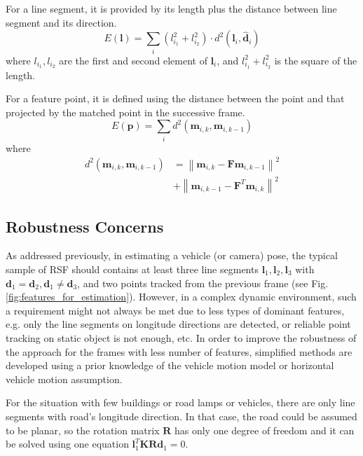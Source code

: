 \documentclass[letterpaper, 10 pt, conference]{ieeeconf}  %
\begin{document}
For a line segment, it is provided by its length plus the distance between line segment and its direction.
\begin{equation}
E(\mathbf{l}) = \sum_{i} \left(l_{i_1}^2+l_{i_2}^2\right) \cdot d^2(\mathbf{l}_i,\hat{\mathbf{d}}_i)
\end{equation}
where $l_{i_1},l_{i_2}$ are the first and second element of $\mathbf{l}_i$, and $l_{i_1}^2+l_{i_2}^2$ is the square of the length.

For a feature point, it is defined using the distance between the point and that projected by the matched point in the successive frame.
\begin{equation}
E(\mathbf{p}) = \sum_{i} d^2(\mathbf{m}_{i,k}, \mathbf{m}_{i,k-1})
\end{equation}
where
\begin{equation}
\begin{split}
d^2(\mathbf{m}_{i,k}, \mathbf{m}_{i,k-1}) & = \left\| \mathbf{m}_{i,k}-\mathbf{F} \mathbf{m}_{i,k-1} \right\|^2 \\
 & + \left\| \mathbf{m}_{i,k-1}- \mathbf{F}^T\mathbf{m}_{i,k} \right\|^2
\end{split}
\end{equation}

\subsection{Robustness Concerns}
As addressed previously, in estimating a vehicle (or camera) pose, the typical sample of RSF should contains at least three line segments $\mathbf{l}_1,\mathbf{l}_2,\mathbf{l}_3$ with $\mathbf{d}_1=\mathbf{d}_2,\mathbf{d}_1\neq \mathbf{d}_3$, and two points tracked from the previous frame (see Fig. \ref{fig:features_for_estimation}).
However, in a complex dynamic environment, such a requirement might not always be met due to less types of dominant features, e.g. only the line segments on longitude directions are detected, or reliable point tracking on static object is not enough, etc. In order to improve the robustness of the approach for the frames with less number of features, simplified methods are developed using a prior knowledge of the vehicle motion model or horizontal vehicle motion assumption.

For the situation with few buildings or road lamps or vehicles, there are only line segments with road's longitude direction. In that case, the road could be assumed to be planar, so the rotation matrix $\mathbf{R}$ has only one degree of freedom and it can be solved using one equation $\mathbf{l}_1^T\mathbf{K}\mathbf{R}\mathbf{d}_1=0$.
\end{document}
